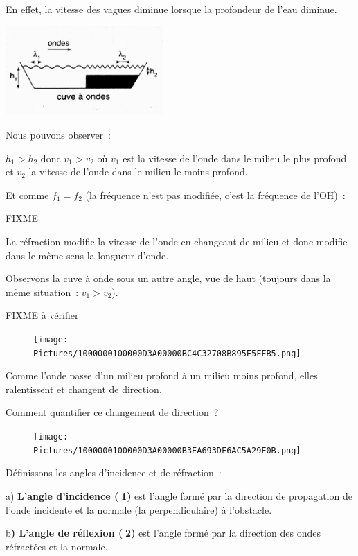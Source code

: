 En effet, la vitesse des vagues diminue lorsque la profondeur de l'eau
diminue.

\includegraphics[width=6.017cm,height=3.408cm]{Pictures/1000000100000A3C000005CCA7E68DBE45CF2A53.png}

Nous pouvons observer~:

$h_1 > h_2$ donc $v_1 > v_2$
où $v_1$ est la vitesse de l'onde dans le milieu le plus profond et $v_2$ la
vitesse de l'onde dans le milieu le moins profond.

Et comme $f_1 = f_2$ (la fréquence n'est pas modifiée, c'est la fréquence de
l'OH)~:

FIXME 

La réfraction modifie la vitesse de l'onde en changeant de milieu et
donc modifie dans le même sens la longueur d'onde.

Observons la cuve à onde sous un autre angle, vue de haut (toujours dans
la même situation~: $v_1>  v_2$).

FIXME à vérifier

\begin{figure}
\centering
\texttt{[image: Pictures/1000000100000D3A00000BC4C32708B895F5FFB5.png]}
\caption{}
\end{figure}

Comme l'onde passe d'un milieu profond à un milieu moins profond, elles
ralentissent et changent de direction.

Comment quantifier ce changement de direction~?

\begin{figure}
\centering
\texttt{[image: Pictures/1000000100000D3A00000B3EA693DF6AC5A29F0B.png]}
\caption{}
\end{figure}

Définissons les angles d'incidence et de réfraction~:

a) \textbf{L'angle d'incidence (1)} est l'angle formé par la direction
de propagation de l'onde incidente et la normale (la perpendiculaire) à
l'obstacle.

b\textbf{) L'angle de réflexion (2)} est l'angle formé par la direction
des ondes réfractées et la normale.

